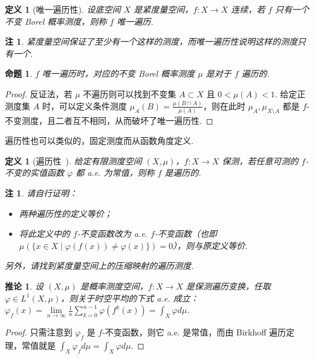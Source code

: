 \documentclass[11pt, a4paper, oneside]{ctexart}
\newtheorem{corollary}[theorem]{推论}
\newtheorem{definition}[theorem]{定义}
\newtheorem{proposition}[theorem]{命题}
\newtheorem{remark}[theorem]{注}
\begin{document}
    \begin{definition}[唯一遍历性]
        设底空间 $X$ 是紧度量空间，$f:X\to X$ 连续，若 $f$ 只有一个不变 Borel 概率测度，则称 $f$ 唯一遍历.
    \end{definition}
    \begin{remark}
        紧度量空间保证了至少有一个这样的测度，而唯一遍历性说明这样的测度只有一个.
    \end{remark}
    \begin{proposition}
        $f$ 唯一遍历时，对应的不变 Borel 概率测度 $\mu$ 是对于 $f$ 遍历的.
    \end{proposition}
    \begin{proof}
        反证法，若 $\mu$ 不遍历则可以找到不变集 $A\subset X$ 且 $0<\mu(A)<1$. 给定正测度集 $A$ 时，可以定义条件测度 $\mu_A(B)=\frac{\mu(B\cap A)}{\mu(A)}$，则在此时 $\mu_A,\mu_{X\setminus A}$ 都是 $f$-不变测度，且二者互不相同，从而破坏了唯一遍历性.
    \end{proof}

    遍历性也可以类似的，固定测度而从函数角度定义.
    \begin{definition}[遍历性~\uppercase\expandafter{}]
        给定有限测度空间 $(X,\mu)$，$f:X\to X$ 保测，若任意可测的 $f$-不变的实值函数 $\varphi$ 都 a.e. 为常值，则称 $f$ 是遍历的.
    \end{definition}
    \begin{remark}
        请自行证明：
        \begin{itemize}
            \item 两种遍历性的定义等价；
            \item 将此定义中的 $f$-不变函数改为 a.e. $f$-不变函数（也即 $\mu(\{x\in X\mid \varphi(f(x))\neq \varphi(x)\})=0$），则与原定义等价.
        \end{itemize}

        另外，请找到紧度量空间上的压缩映射的遍历测度.
    \end{remark}

    \begin{corollary}
        设 $(X,\mu)$ 是概率测度空间，$f:X\to X$ 是保测遍历变换，任取 $\varphi\in L^1(X,\mu)$，则关于时空平均的下式 a.e. 成立：$\varphi_f(x)=\lim\limits_{n\to\infty}\frac{1}{n}\sum\limits_{k=0}^{n-1}\varphi(f^k(x))=\int_{X}\varphi d\mu$.
    \end{corollary}
    \begin{proof}
        只需注意到 $\varphi_f$ 是 $f$-不变函数，则它 a.e. 是常值，而由 Birkhoff 遍历定理，常值就是 $\int_{X}\varphi_f d\mu=\int_{X}\varphi d\mu$.
    \end{proof}
\end{document}
